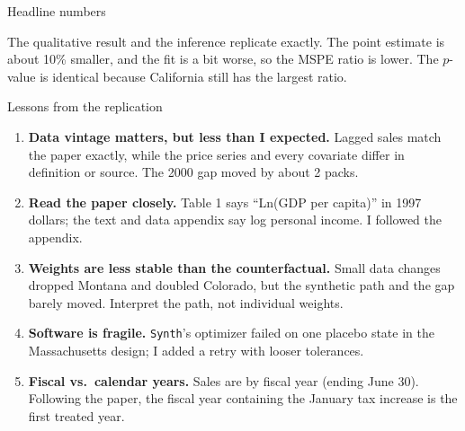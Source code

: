 \documentclass[10pt,aspectratio=169]{beamer}
\begin{document}
\begin{frame}{Headline numbers}
\centering


\medskip
\begin{minipage}{0.8\textwidth}
The qualitative result and the inference replicate exactly. The point
estimate is about 10\% smaller, and the fit is a bit worse, so the MSPE
ratio is lower. The $p$-value is identical because California still has the
largest ratio.
\end{minipage}
\end{frame}

\begin{frame}{Lessons from the replication}
\begin{enumerate}
\item \textbf{Data vintage matters, but less than I expected.} Lagged sales
match the paper exactly, while the price series and every covariate differ
in definition or source. The 2000 gap moved by about 2 packs.
\item \textbf{Read the paper closely.} Table 1 says ``Ln(GDP per capita)'' in
1997 dollars; the text and data appendix say log personal income. I followed
the appendix.
\item \textbf{Weights are less stable than the counterfactual.} Small data
changes dropped Montana and doubled Colorado, but the synthetic path and the
gap barely moved. Interpret the path, not individual weights.
\item \textbf{Software is fragile.} \texttt{Synth}'s optimizer failed on one
placebo state in the Massachusetts design; I added a retry with looser
tolerances.
\item \textbf{Fiscal vs.\ calendar years.} Sales are by fiscal year (ending
June 30). Following the paper, the fiscal year containing the January tax
increase is the first treated year.
\end{enumerate}
\end{frame}
\end{document}
